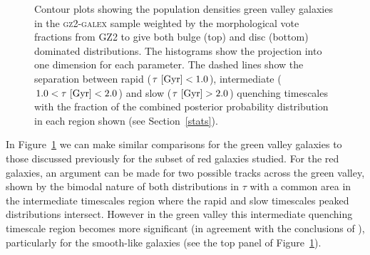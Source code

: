 \begin{figure}
\caption[Population densities of green smooth and disc galaxies]{Contour plots showing the population densities green valley galaxies in the \textsc{gz2-galex} sample weighted by the morphological vote fractions from GZ2 to give both bulge (top) and disc (bottom) dominated distributions. The histograms show the projection into one dimension for each parameter. The dashed lines show the separation between rapid ($\tau ~\rm{[Gyr]} < 1.0$), intermediate ($1.0 < \tau ~\rm{[Gyr]} < 2.0$) and slow ($\tau ~\rm{[Gyr]} > 2.0$) quenching timescales with the fraction of the combined posterior probability distribution in each region shown (see Section~\ref{stats}).}
\label{green_v}
\end{figure}

In Figure~\ref{green_v} we can make similar comparisons for the green valley galaxies to those discussed previously for the subset of red galaxies studied. For the red galaxies, an argument can be made for two possible tracks across the green valley, shown by the bimodal nature of both distributions in $\tau$ with a common area in the intermediate timescales region where the rapid and slow timescales peaked distributions intersect. However in the green valley this intermediate quenching timescale region becomes more significant  (in agreement with the conclusions of \citealt{Gonc12}), particularly for the smooth-like galaxies (see the top panel of Figure~\ref{green_v}).

